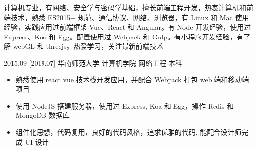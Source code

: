\documentclass[zh]{resume}
\begin{document}
\makeheader

{\onehalfspacing\hspace{2em}%
计算机专业，有网络、安全学与密码学基础，擅长前端工程开发，热衷计算机和前端技术，熟悉 ES2015+ 规范、通信协议、网络、浏览器，有 Linux 和 Mac 使用经验，实践应用过前端框架 Vue、React 和 Angular。有 Node 开发经验，使用过 Express、Koa 和 Egg。配置使用过 Webpack 和 Gulp。有小程序开发经验，有了解 webGL 和 threejs。热爱学习，关注最新前端技术
\par}


\begin{educations}
  \education%
    {2015.09}%
    [2019.07]%
    {华南师范大学}%
    {计算机学院}%
    {网络工程}%
    {本科}
\end{educations}

\begin{itemize}
  \item 熟悉使用 react vue 技术栈开发应用，并配合 Webpack 打包 web 端和移动端项目
  \item 使用 NodeJS 搭建服务器，使用过 Express, Koa 和 Egg，操作 Redis 和 MongoDB 数据库
  \item 组件化思想，代码复用，良好的代码风格，追求优雅的代码, 能配合设计师完成 UI 设计
\end{itemize}
\end{document}
